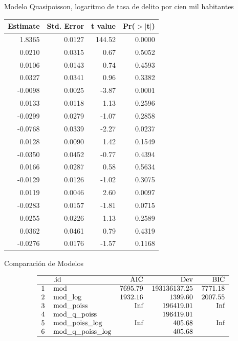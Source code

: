 \documentclass[ignorenonframetext,]{beamer}
\begin{document}
\begin{frame}{Modelo Quasipoisson, logaritmo de tasa de delito por cien
mil habitantes}

\begin{table}[ht]
\centering
{\tiny
\begin{tabular}{rrrr}
  \hline
Estimate & Std. Error & t value & Pr($>$$|$t$|$) \\ 
  \hline
1.8365 & 0.0127 & 144.52 & 0.0000 \\ 
  0.0210 & 0.0315 & 0.67 & 0.5052 \\ 
  0.0106 & 0.0143 & 0.74 & 0.4593 \\ 
  0.0327 & 0.0341 & 0.96 & 0.3382 \\ 
  -0.0098 & 0.0025 & -3.87 & 0.0001 \\ 
  0.0133 & 0.0118 & 1.13 & 0.2596 \\ 
  -0.0299 & 0.0279 & -1.07 & 0.2858 \\ 
  -0.0768 & 0.0339 & -2.27 & 0.0237 \\ 
  0.0128 & 0.0090 & 1.42 & 0.1549 \\ 
  -0.0350 & 0.0452 & -0.77 & 0.4394 \\ 
  0.0166 & 0.0287 & 0.58 & 0.5634 \\ 
  -0.0129 & 0.0126 & -1.02 & 0.3075 \\ 
  0.0119 & 0.0046 & 2.60 & 0.0097 \\ 
  -0.0283 & 0.0157 & -1.81 & 0.0715 \\ 
  0.0255 & 0.0226 & 1.13 & 0.2589 \\ 
  0.0362 & 0.0461 & 0.79 & 0.4319 \\ 
  -0.0276 & 0.0176 & -1.57 & 0.1168 \\ 
   \hline
\end{tabular}
}
\end{table}

\end{frame}

\begin{frame}{Comparación de Modelos}

\[ \begin{tabular}{rlrrr}
  \hline
 & .id & AIC & Dev & BIC \\ 
  \hline
1 & mod & 7695.79 & 193136137.25 & 7771.18 \\ 
  2 & mod\_log & 1932.16 & 1399.60 & 2007.55 \\ 
  3 & mod\_poiss & Inf & 196419.01 & Inf \\ 
  4 & mod\_q\_poiss &  & 196419.01 &  \\ 
  5 & mod\_poiss\_log & Inf & 405.68 & Inf \\ 
  6 & mod\_q\_poiss\_log &  & 405.68 &  \\ 
   \hline
\end{tabular} \]

\end{frame}
\end{document}
